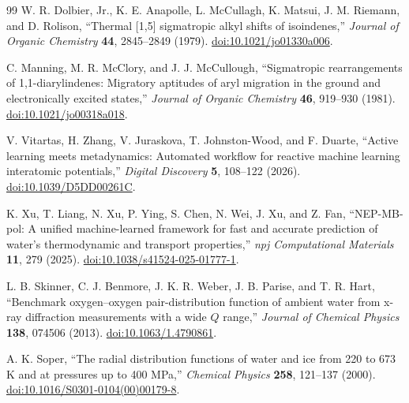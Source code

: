 \documentclass[aps,prx,preprint,notitlepage,superscriptaddress,nofootinbib,floatfix]{revtex4-2}
\newif\ifshowrevisions
\newcommand{\draftseven}[1]{%
  \ifshowrevisions\textcolor{draftsevencolor}{#1}\else#1\fi}
\begin{document}
\begin{thebibliography}{99}
\draftseven{W. R. Dolbier, Jr., K. E. Anapolle, L. McCullagh, K. Matsui,
J. M. Riemann, and D. Rolison,
``Thermal [1,5] sigmatropic alkyl shifts of isoindenes,''
\emph{Journal of Organic Chemistry} \textbf{44}, 2845--2849 (1979).
\href{https://doi.org/10.1021/jo01330a006}{doi:10.1021/jo01330a006}.}

\draftseven{C. Manning, M. R. McClory, and J. J. McCullough,
``Sigmatropic rearrangements of 1,1-diarylindenes: Migratory aptitudes of aryl
migration in the ground and electronically excited states,''
\emph{Journal of Organic Chemistry} \textbf{46}, 919--930 (1981).
\href{https://doi.org/10.1021/jo00318a018}{doi:10.1021/jo00318a018}.}

\draftseven{V. Vitartas, H. Zhang, V. Juraskova, T. Johnston-Wood, and
F. Duarte,
``Active learning meets metadynamics: Automated workflow for reactive machine
learning interatomic potentials,'' \emph{Digital Discovery} \textbf{5},
108--122 (2026).
\href{https://doi.org/10.1039/D5DD00261C}{doi:10.1039/D5DD00261C}.}

K. Xu, T. Liang, N. Xu, P. Ying, S. Chen, N. Wei, J. Xu, and Z. Fan,
``NEP-MB-pol: A unified machine-learned framework for fast and accurate
prediction of water's thermodynamic and transport properties,''
\emph{npj Computational Materials} \textbf{11}, 279 (2025).
\href{https://doi.org/10.1038/s41524-025-01777-1}{doi:10.1038/s41524-025-01777-1}.

L. B. Skinner, C. J. Benmore, J. K. R. Weber, J. B. Parise, and T. R. Hart,
``Benchmark oxygen--oxygen pair-distribution function of ambient water from
x-ray diffraction measurements with a wide $Q$ range,''
\emph{Journal of Chemical Physics} \textbf{138}, 074506 (2013).
\href{https://doi.org/10.1063/1.4790861}{doi:10.1063/1.4790861}.

A. K. Soper,
``The radial distribution functions of water and ice from 220 to 673 K and at
pressures up to 400 MPa,'' \emph{Chemical Physics} \textbf{258}, 121--137
(2000).
\href{https://doi.org/10.1016/S0301-0104(00)00179-8}{doi:10.1016/S0301-0104(00)00179-8}.

\end{thebibliography}
\end{document}
